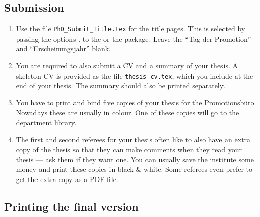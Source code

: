\subsection{Submission}

\begin{enumerate}
\item Use the file \texttt{PhD\_Submit\_Title.tex} for the title
  pages. 
  This is selected by passing the options .
  to the  or the  package.
  Leave the \foreignquote{ngerman}{Tag der Promotion} and
  \foreignquote{ngerman}{Erscheinungsjahr} blank.
\item You are required to also submit a CV and a summary of your
  thesis. A skeleton CV is provided as the file
  \texttt{thesis\_cv.tex}, which you include at the end of your
  thesis. The summary should also be printed separately.
\item You have to print and bind five copies of your thesis for the
  \foreignlanguage{ngerman}{Promotionsbüro}. Nowadays these are
  usually in colour.
  One of these copies will go to the department library.
\item The first and second referees for your thesis often like to also
  have an extra copy of the thesis so that they can make comments when they read
  your thesis --- ask them if they want one. You can usually save the
  institute some money and print these copies in black \& white.
  Some referees even prefer to get the extra copy as a PDF file.
\end{enumerate}


\subsection{Printing the final version}

